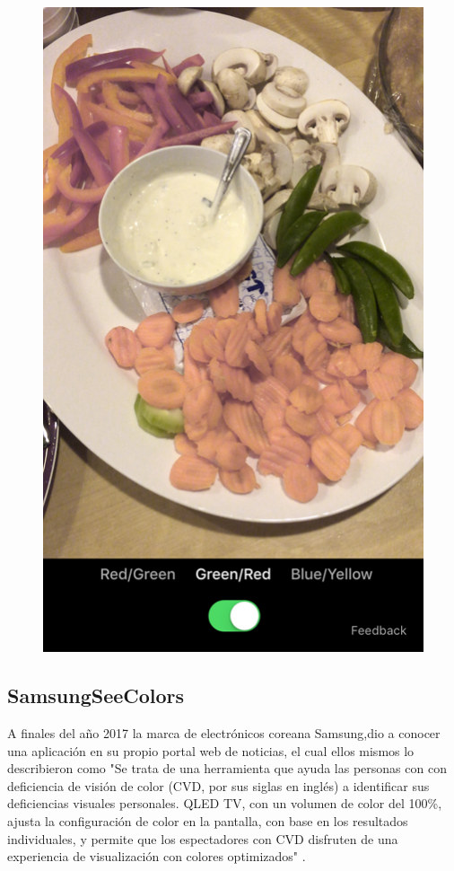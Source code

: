 \documentclass[10pt]{article}
\begin{document}
\begin{figure}[H]
	\begin{center}
\includegraphics[scale = 0.35]{Imagenes/Color_Binoculars_03-1.png}
	\end{center} 
\end{figure}

\subsection{Samsung\textregistered \space SeeColors }

A finales del año 2017 la marca de electrónicos coreana Samsung\textregistered,\space dio a conocer una aplicación en su propio portal web de noticias, el cual ellos mismos lo describieron como "Se trata de una herramienta que ayuda las personas con con deficiencia de visión de color (CVD, por sus siglas en inglés) a identificar sus deficiencias visuales personales. QLED TV, con un volumen de color del 100\%, ajusta la configuración de color en la pantalla, con base en los resultados individuales, y permite que los espectadores con CVD disfruten de una experiencia de visualización con colores optimizados" \cite{IEEEreferencias:Ref3}. \newline
\end{document}
